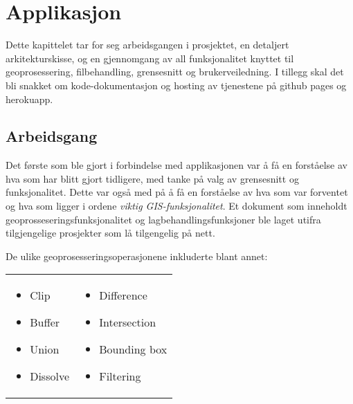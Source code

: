 \chapter{Applikasjon}

Dette kapittelet tar for seg arbeidsgangen i prosjektet, en detaljert arkitekturskisse, og en gjennomgang av all funksjonalitet knyttet til geoprosessering, filbehandling, grensesnitt og brukerveiledning. I tillegg skal det bli snakket om kode-dokumentasjon og hosting av tjenestene på github pages og herokuapp. 

\section{Arbeidsgang}

Det første som ble gjort i forbindelse med applikasjonen var å få en forståelse av hva som har blitt gjort tidligere, med tanke på valg av grensesnitt og funksjonalitet. Dette var også med på å få en forståelse av hva som var forventet og hva som ligger i ordene \textit{viktig GIS-funksjonalitet}. Et dokument som inneholdt geoprosseseringsfunksjonalitet og lagbehandlingsfunksjoner ble laget utifra tilgjengelige prosjekter\cite{Johanessen}\cite{Strand}\cite{Eglaaen}\cite{Villanger}\cite{Jakobsen} som lå tilgengelig på nett.

De ulike geoprosesseringsoperasjonene inkluderte blant annet:

\begin{frame}

    \begin{tabular}{p{}p{}}

        \begin{itemize}
            \item Clip
            \item Buffer
            \item Union
            \item Dissolve
        \end{itemize} &

        \begin{itemize}
            \item Difference
            \item Intersection
            \item Bounding box
            \item Filtering
        \end{itemize}
    \end{tabular}

\end{frame}

